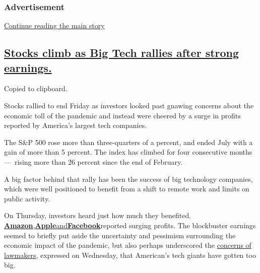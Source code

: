 \hypertarget{advertisement}{%
\subsubsection{Advertisement}\label{advertisement}}

\protect\hyperlink{after-dfp-ad-mid1}{Continue reading the main story}

\hypertarget{stocks-climb-as-big-tech-rallies-after-strong-earnings}{%
\subsection{\texorpdfstring{\protect\hyperlink{stocks-climb-as-big-tech-rallies-after-strong-earnings}{Stocks
climb as Big Tech rallies after strong
earnings.}}{Stocks climb as Big Tech rallies after strong earnings.}}\label{stocks-climb-as-big-tech-rallies-after-strong-earnings}}

Copied to clipboard.

Stocks rallied to end Friday as investors looked past gnawing concerns
about the economic toll of the pandemic and instead were cheered by a
surge in profits reported by America's largest tech companies.

The S\&P 500 rose more than three-quarters of a percent, and ended July
with a gain of more than 5 percent. The index has climbed for four
consecutive months ---~rising more than 26 percent since the end of
February.

A big factor behind that rally has been the success of big technology
companies, which were well positioned to benefit from a shift to remote
work and limits on public activity.

On Thursday, investors heard just how much they benefited.
\textbf{\href{https://www.nytimes.com/live/2020/07/30/business/stock-market-today-coronavirus/alphabets-revenue-drops-but-beats-wall-street-expectations}{Amazon}}\href{https://www.nytimes.com/live/2020/07/30/business/stock-market-today-coronavirus/alphabets-revenue-drops-but-beats-wall-street-expectations}{,}\textbf{\href{https://www.nytimes.com/live/2020/07/30/business/stock-market-today-coronavirus/alphabets-revenue-drops-but-beats-wall-street-expectations}{Apple}}\href{https://www.nytimes.com/live/2020/07/30/business/stock-market-today-coronavirus/alphabets-revenue-drops-but-beats-wall-street-expectations}{and}\textbf{\href{https://www.nytimes.com/live/2020/07/30/business/stock-market-today-coronavirus/alphabets-revenue-drops-but-beats-wall-street-expectations}{Facebook}}\href{https://www.nytimes.com/live/2020/07/30/business/stock-market-today-coronavirus/alphabets-revenue-drops-but-beats-wall-street-expectations}{}reported
surging profits. The blockbuster earnings seemed to briefly put aside
the uncertainty and pessimism surrounding the economic impact of the
pandemic, but also perhaps underscored the
\href{https://www.nytimes.com/2020/07/29/technology/big-tech-hearing-apple-amazon-facebook-google.html}{concerns
of lawmakers}, expressed on Wednesday, that American's tech giants have
gotten too big.

